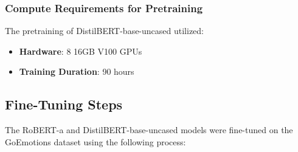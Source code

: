 \documentclass[titlepage]{article}
\begin{document}
\subsubsection{Compute Requirements for Pretraining}
The pretraining of DistilBERT-base-uncased utilized:
\begin{itemize}
    \item \textbf{Hardware}: 8 16GB V100 GPUs
    \item \textbf{Training Duration}: 90 hours
\end{itemize}

\subsection{Fine-Tuning Steps}
The RoBERT-a and DistilBERT-base-uncased models were fine-tuned on the GoEmotions dataset using the following process:
\end{document}
